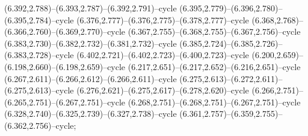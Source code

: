 (6.392,2.788)--(6.393,2.787)--(6.392,2.791)--cycle (6.395,2.779)--(6.396,2.780)--(6.395,2.784)--cycle (6.376,2.777)--(6.376,2.775)--(6.378,2.777)--cycle (6.368,2.768)--(6.366,2.760)--(6.369,2.770)--cycle (6.367,2.755)--(6.368,2.755)--(6.367,2.756)--cycle (6.383,2.730)--(6.382,2.732)--(6.381,2.732)--cycle (6.385,2.724)--(6.385,2.726)--(6.383,2.728)--cycle (6.402,2.721)--(6.402,2.723)--(6.400,2.723)--cycle (6.200,2.659)--(6.198,2.660)--(6.198,2.659)--cycle (6.217,2.651)--(6.217,2.652)--(6.216,2.651)--cycle (6.267,2.611)--(6.266,2.612)--(6.266,2.611)--cycle (6.275,2.613)--(6.272,2.611)--(6.275,2.613)--cycle (6.276,2.621)--(6.275,2.617)--(6.278,2.620)--cycle (6.266,2.751)--(6.265,2.751)--(6.267,2.751)--cycle (6.268,2.751)--(6.268,2.751)--(6.267,2.751)--cycle (6.328,2.740)--(6.325,2.739)--(6.327,2.738)--cycle (6.361,2.757)--(6.359,2.755)--(6.362,2.756)--cycle;
